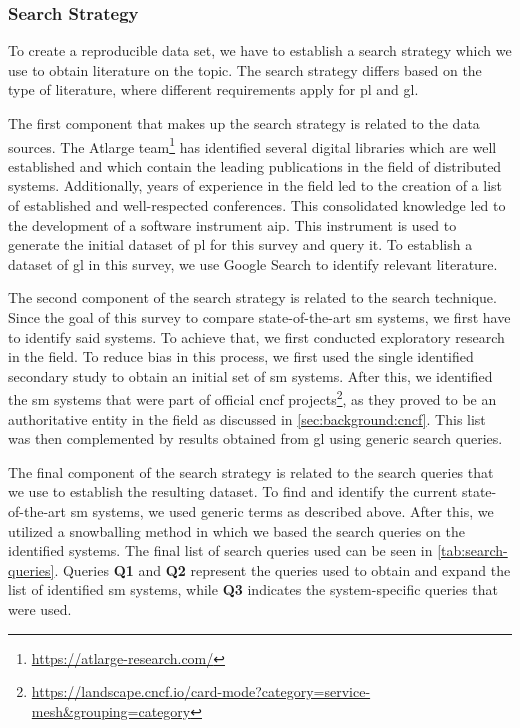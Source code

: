 \subsubsection{Search Strategy}
\label{sec:survey:methodology:review-protocol:search-strategy}

To create a reproducible data set, we have to establish a search strategy which we use to obtain literature on the topic. The search strategy differs based on the type of literature, where different requirements apply for \gls{pl} and \gls{gl}.


The first component that makes up the search strategy is related to the data sources. The Atlarge  team\footnote{\url{https://atlarge-research.com/}} has identified several digital libraries which are well established and which contain the leading publications in the field of distributed systems. Additionally, years of experience in the field led to the creation of a list of established and well-respected conferences. This consolidated knowledge led to the development of a software instrument \gls{aip}. This instrument is used to generate the initial dataset of \gls{pl} for this survey and query it. To establish a dataset of \gls{gl} in this survey, we use Google Search to identify relevant literature.

The second component of the search strategy is related to the search technique. Since the goal of this survey to compare state-of-the-art \gls{sm} systems, we first have to identify said systems. To achieve that, we first conducted exploratory research in the field. To reduce bias in this process, we first used the single identified secondary study \cite{service-mesh-survey} to obtain an initial set of \gls{sm} systems. After this, we identified the \gls{sm} systems that were part of official \gls{cncf} projects\footnote{\url{https://landscape.cncf.io/card-mode?category=service-mesh&grouping=category}}, as they proved to be an authoritative entity in the field as discussed in \cref{sec:background:cncf}. This list was then complemented by results obtained from \gls{gl} using generic search queries. 


The final component of the search strategy is related to the search queries that we use to establish the resulting dataset. To find and identify the current state-of-the-art \gls{sm} systems, we used generic terms as described above. After this, we utilized a snowballing method in which we based the search queries on the identified systems. The final list of search queries used can be seen in \cref{tab:search-queries}. Queries \textbf{Q1} and \textbf{Q2} represent the queries used to obtain and expand the list of identified \gls{sm} systems, while \textbf{Q3} indicates the system-specific queries that were used. 

